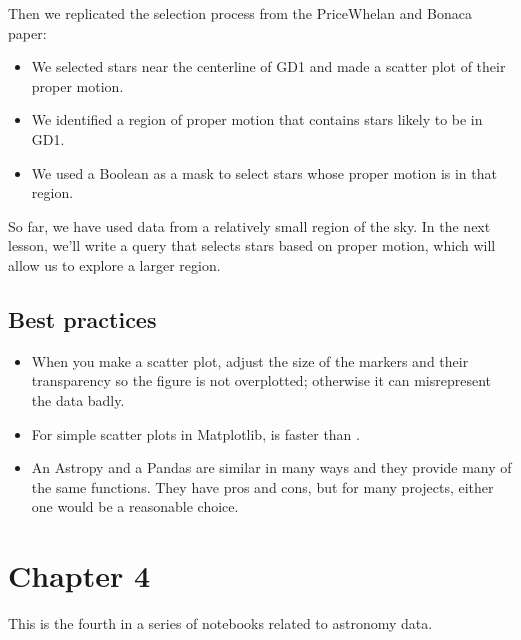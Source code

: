 \documentclass[letterpaper,10pt,english]{sphinxmanual}
\begin{document}
Then we replicated the selection process from the Price\sphinxhyphen{}Whelan and Bonaca paper:
\begin{itemize}
\item {} 
We selected stars near the centerline of GD\sphinxhyphen{}1 and made a scatter plot of their proper motion.

\item {} 
We identified a region of proper motion that contains stars likely to be in GD\sphinxhyphen{}1.

\item {} 
We used a Boolean  as a mask to select stars whose proper motion is in that region.

\end{itemize}

So far, we have used data from a relatively small region of the sky.  In the next lesson, we’ll write a query that selects stars based on proper motion, which will allow us to explore a larger region.


\section{Best practices}
\label{\detokenize{03_motion:best-practices}}\begin{itemize}
\item {} 
When you make a scatter plot, adjust the size of the markers and their transparency so the figure is not overplotted; otherwise it can misrepresent the data badly.

\item {} 
For simple scatter plots in Matplotlib,  is faster than .

\item {} 
An Astropy  and a Pandas  are similar in many ways and they provide many of the same functions.  They have pros and cons, but for many projects, either one would be a reasonable choice.

\end{itemize}


\chapter{Chapter 4}
\label{\detokenize{04_select:chapter-4}}\label{\detokenize{04_select::doc}}
This is the fourth in a series of notebooks related to astronomy data.
\end{document}
